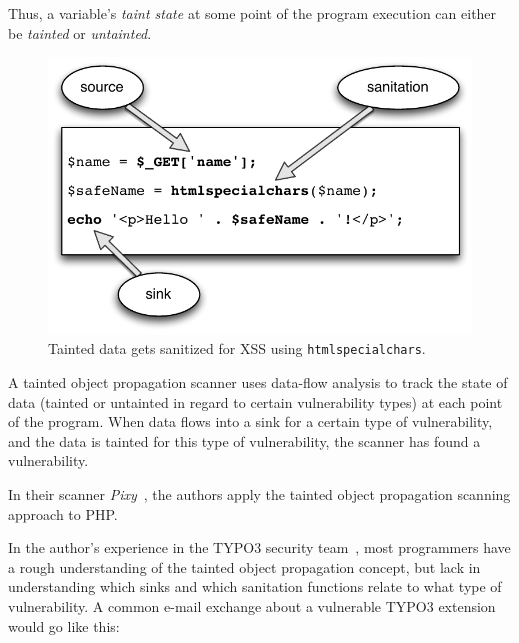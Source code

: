 Thus, a variable's \emph{taint state}\label{taint-state} at some point of the program execution can either be \emph{tainted} or \emph{untainted}.

\begin{figure}[htb]
  \begin{center}
    \includegraphics[scale=0.75]{images/taint-and-clean}
    \caption{Tainted data gets sanitized for XSS using \texttt{htmlspecialchars}.}
    \label{fig:taint-and-clean}
  \end{center}
\end{figure}

A tainted object propagation scanner uses data-flow analysis to track the state of data (tainted or untainted in regard to certain vulnerability types) at each point of the program. When data flows into a sink for a certain type of vulnerability, and the data is tainted for this type of vulnerability, the scanner has found a vulnerability.

In their scanner \emph{Pixy}~\cite{pixy-short, pixy-long, pixy-dissertation}, the authors apply the tainted object propagation scanning approach to PHP.

In the author's experience in the TYPO3 security team~\cite{security-team-members}, most programmers have a rough understanding of the tainted object  propagation concept, but lack in understanding which sinks and which sanitation functions relate to what type of vulnerability. A common e-mail exchange about a vulnerable TYPO3 extension would go like this:

